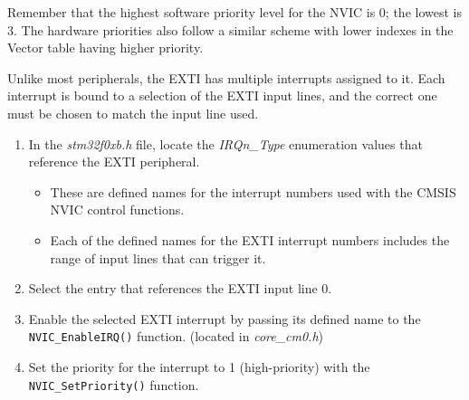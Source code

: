 \documentclass[11pt,fleqn]{book} %
\begin{document}
\begin{warning}
    Remember that the highest software priority level for the NVIC is 0; the lowest is 3. The hardware priorities also follow a similar scheme with lower indexes in the Vector table having higher priority. 
\end{warning}

\begin{exercise}
    \label{ex4}
    Unlike most peripherals, the EXTI has multiple interrupts assigned to it. Each interrupt is bound to a selection of the EXTI input lines, and the correct one must be chosen to match the input line used. 
    \begin{enumerate}
        \item In the \textit{stm32f0xb.h} file, locate the \textit{IRQn\_Type} enumeration values that reference the EXTI peripheral. 
        \begin{itemize}
            \item These are defined names for the interrupt numbers used with the CMSIS NVIC control functions.
            \item Each of the defined names for the EXTI interrupt numbers includes the range of input lines that can trigger it. 
        \end{itemize}
        \item Select the entry that references the EXTI input line 0.
        \item Enable the selected EXTI interrupt by passing its defined name to the  \texttt{NVIC\_EnableIRQ()} function. (located in \textit{core\_cm0.h})
        \item Set the priority for the interrupt to 1 (high-priority) with the \texttt{NVIC\_SetPriority()} function.
    \end{enumerate}
    
\end{exercise}


\end{document}
